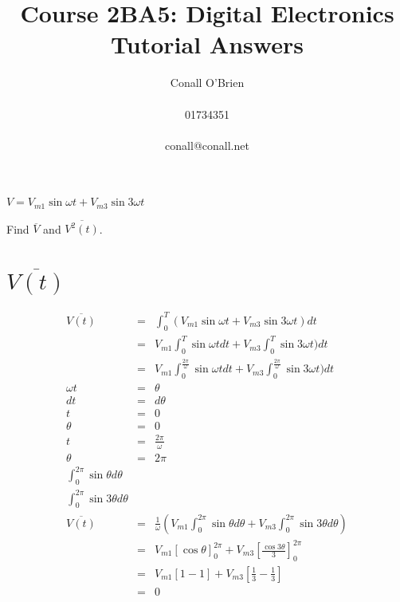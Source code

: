 \documentclass[a4paper,12pt]{article}
\begin{document}
\title{Course 2BA5: Digital Electronics \\ Tutorial Answers}

\author{Conall O'Brien \\ \\ 01734351 \\ \\ conall@conall.net}

\maketitle

\noindent $V = V_{m1} \sin{\omega t} + V_{m3} \sin{3 \omega t}$

\vspace{5mm}

\noindent Find $\overline{V}$ and $\overline{V^{2}(t)}$.

\section{$\overline{V(t)}$}

\begin{eqnarray*}
\overline{V(t)} & = & \int^{T}_{0} (V_{m1} \sin{\omega t} + V_{m3} \sin{3 \omega t}) dt \\
					 & = & V_{m1} \int^{T}_{0} \sin{\omega t} dt + V_{m3} \int^{T}_{0} \sin{3 \omega t}) dt \\
					 & = & V_{m1} \int^{\frac{2 \pi}{\omega}}_{0} \sin{\omega t} dt + V_{m3} \int^{\frac{2 \pi}{\omega}}_{0} \sin{3 \omega t}) dt \\
\omega t        & = & \theta \\
d t				 & = & d \theta \\
t               & = & 0 \\
\theta          & = & 0 \\
t               & = & \frac{2 \pi}{\omega} \\
\theta          & = & 2 \pi \\
\int^{2 \pi}_{0} \sin{\theta} d\theta & & \\
\int^{2 \pi}_{0} \sin{3 \theta} d\theta & & \\
\overline{V(t)} & = & \frac{1}{\omega} \left( V_{m1} \int^{2 \pi}_{0}
\sin{\theta} d \theta + V_{m3} \int^{2 \pi}_{0} \sin{3 \theta} d \theta \right) \\
					 & = & V_{m1} [\cos{\theta}]^{2 \pi}_{0} + V_{m3} \left[
					 \frac{\cos{3 \theta}}{3} \right]^{2 \pi}_{0} \\
					 & = & V_{m1} [ 1 - 1] + V_{m3} \left[ \frac{1}{3} -
					 \frac{1}{3} \right] \\
					 & = & 0
\end{eqnarray*}
\end{document}
